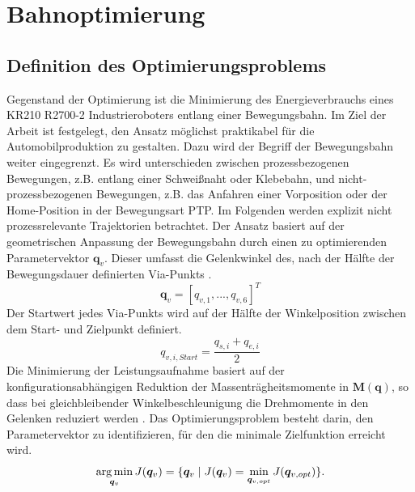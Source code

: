 \chapter{Bahnoptimierung}
%
\section{Definition des Optimierungsproblems}
Gegenstand der Optimierung ist die Minimierung des Energieverbrauchs eines KR210 R2700-2 Industrieroboters entlang einer Bewegungsbahn. Im Ziel der Arbeit ist festgelegt, den Ansatz möglichst praktikabel für die Automobilproduktion zu gestalten. Dazu wird der Begriff der Bewegungsbahn weiter eingegrenzt. Es wird unterschieden zwischen prozessbezogenen Bewegungen, z.B. entlang einer Schweißnaht oder Klebebahn, und nicht-prozessbezogenen Bewegungen, z.B. das Anfahren einer Vorposition oder der Home-Position in der Bewegungsart PTP. Im Folgenden werden explizit nicht prozessrelevante Trajektorien betrachtet. Der Ansatz basiert auf der geometrischen Anpassung  der Bewegungsbahn durch einen zu optimierenden Parametervektor $\bm{q}_{v}$. Dieser umfasst die Gelenkwinkel des, nach der Hälfte der Bewegungsdauer definierten Via-Punkts \cite[S~532~ f.]{Ziaukas.2017}.
%
\begin{equation}
	\bm{q}_{v} = [q_{v,1},...,q_{v,6}]^T 
\end{equation}
%
Der Startwert jedes Via-Punkts wird auf der Hälfte der Winkelposition zwischen dem Start- und Zielpunkt definiert.
\begin{equation}
	q_{v,i,Start} = \dfrac{q_{s,i}+q_{e,i}}{2}
\end{equation}
Die Minimierung der Leistungsaufnahme basiert auf der konfigurationsabhängigen Reduktion der Massenträgheitsmomente in $\bm{M}(\bm{q})$, so dass bei gleichbleibender Winkelbeschleunigung die Drehmomente in den Gelenken reduziert werden \cite[S.~531]{Ziaukas.2017}. Das Optimierungsproblem besteht darin, den Parametervektor zu identifizieren, für den die minimale Zielfunktion erreicht wird.
%
\begin{equation}
	\operatorname*{arg\,min}_{\bm{q}_{v}} J(\bm{q}_{v}) = \{\bm{q}_{v} \mid J(\bm{q}_{v}) = \min_{\bm{q}_{v,opt}} J(\bm{q}_{v,opt})\}.
\end{equation}
%
